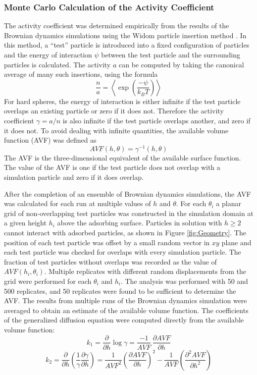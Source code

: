 \subsubsection{Monte Carlo Calculation of the Activity Coefficient}

The activity coefficient was determined empirically from the results
of the Brownian dynamics simulations using the Widom particle insertion
method \cite{Widom1963,Dullens2005}. In this method, a {}``test''
particle is introduced into a fixed configuration of particles and
the energy of interaction $\psi$ between the test particle and the
surrounding particles is calculated. The activity $a$ can be computed
by taking the canonical average of many such insertions, using the
formula\begin{equation}
\frac{n}{a}=\left\langle \exp\left(\frac{-\psi}{k_{B}T}\right)\right\rangle \label{eq:Widom equation}\end{equation}
For hard spheres, the energy of interaction is either infinite if
the test particle overlaps an existing particle or zero if it does
not. Therefore the activity coefficient $\gamma=a/n$ is also infinite
if the test particle overlaps another, and zero if it does not. To
avoid dealing with infinite quantities, the available volume function
(AVF) was defined as \begin{equation}
AVF\left(h,\theta\right)=\gamma^{-1}\left(h,\theta\right)\label{eq:AVF}\end{equation}
The AVF is the three-dimensional equivalent of the available surface
function. The value of the AVF is one if the test particle does not
overlap with a simulation particle and zero if it does overlap. 

After the completion of an ensemble of Brownian dynamics simulations,
the AVF was calculated for each run at multiple values of $h$ and
$\theta$. For each $\theta_{i}$ a planar grid of non-overlapping
test particles was constructed in the simulation domain at a given
height $h_{i}$ above the adsorbing surface. Particles in solution
with $h\geq2$ cannot interact with adsorbed particles, as shown in
Figure \ref{fig:Geometry}. The position of each test particle was
offset by a small random vector in $xy$ plane and each test particle
was checked for overlaps with every simulation particle. The fraction
of test particles without overlaps was recorded as the value of $AVF\left(h_{i},\theta_{i}\right)$.
Multiple replicates with different random displacements from the grid
were performed for each $\theta_{i}$ and $h_{i}$. The analysis was
performed with 50 and 500 replicates, and 50 replicates were found
to be sufficient to determine the AVF. The results from multiple runs
of the Brownian dynamics simulation were averaged to obtain an estimate
of the available volume function. The coefficients of the generalized
diffusion equation were computed directly from the available volume
function:\[
k_{1}=\frac{\partial}{\partial h}\log\gamma=\frac{-1}{AVF}\,\frac{\partial AVF}{\partial h}\]
\[
k_{2}=\frac{\partial}{\partial h}\left(\frac{1}{\gamma}\frac{\partial\gamma}{\partial h}\right)=\frac{1}{AVF^{2}}\left(\frac{\partial AVF}{\partial h}\right)^{2}-\frac{1}{AVF}\left(\frac{\partial^{2}AVF}{\partial h^{2}}\right)\]



